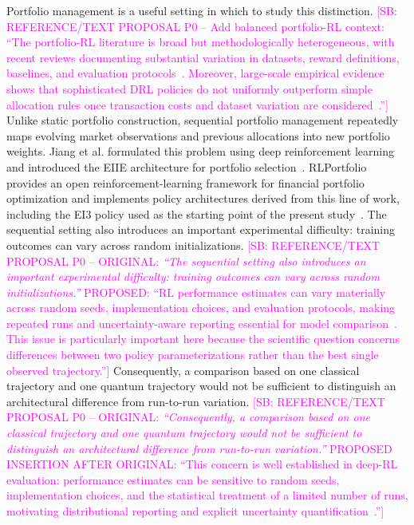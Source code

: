 \documentclass[aps,floatfix,superscriptaddress,twocolumn,tightenlines,amsmath,amssymb,nofootinbib,10pt,longbibliography,prl]{revtex4-2}
\newcommand{\sam}[1]{\textcolor{magenta}{[SB: {#1}]}}
\begin{document}
Portfolio management is a useful setting in which to study this distinction.
\sam{REFERENCE/TEXT PROPOSAL P0 -- Add balanced portfolio-RL context: ``The portfolio-RL literature is broad but methodologically heterogeneous, with recent reviews documenting substantial variation in datasets, reward definitions, baselines, and evaluation protocols~\cite{Rezaei2025DRLPortfolioReview,Rout2026RLPortfolioReview}. Moreover, large-scale empirical evidence shows that sophisticated DRL policies do not uniformly outperform simple allocation rules once transaction costs and dataset variation are considered~\cite{Kruthof2025CanDRLBeat1N}.''} Unlike static portfolio construction, sequential portfolio management repeatedly maps evolving market observations and previous allocations into new portfolio weights. Jiang et al. formulated this problem using deep reinforcement learning and introduced the EIIE architecture for portfolio selection~\cite{jiang2017deepreinforcementlearningframework}. RLPortfolio provides an open reinforcement-learning framework for financial portfolio optimization and implements policy architectures derived from this line of work, including the EI3 policy used as the starting point of the present study~\cite{RLportfolio}. The sequential setting also introduces an important experimental difficulty: training outcomes can vary across random initializations.
\sam{REFERENCE/TEXT PROPOSAL P0 -- ORIGINAL: \textit{``The sequential setting also introduces an important experimental difficulty: training outcomes can vary across random initializations.''} PROPOSED: ``RL performance estimates can vary materially across random seeds, implementation choices, and evaluation protocols, making repeated runs and uncertainty-aware reporting essential for model comparison~\cite{Henderson2018DRLMatters,Agarwal2021StatisticalPrecipice,Patterson2024EmpiricalDesign}. This issue is particularly important here because the scientific question concerns differences between two policy parameterizations rather than the best single observed trajectory.''} Consequently, a comparison based on one classical trajectory and one quantum trajectory would not be sufficient to distinguish an architectural difference from run-to-run variation.
\sam{REFERENCE/TEXT PROPOSAL P0 -- ORIGINAL: \textit{``Consequently, a comparison based on one classical trajectory and one quantum trajectory would not be sufficient to distinguish an architectural difference from run-to-run variation.''} PROPOSED INSERTION AFTER ORIGINAL: ``This concern is well established in deep-RL evaluation: performance estimates can be sensitive to random seeds, implementation choices, and the statistical treatment of a limited number of runs, motivating distributional reporting and explicit uncertainty quantification~\cite{Henderson2018DRLMatters,Agarwal2021StatisticalPrecipice,Patterson2024EmpiricalDesign}.''}
\end{document}
